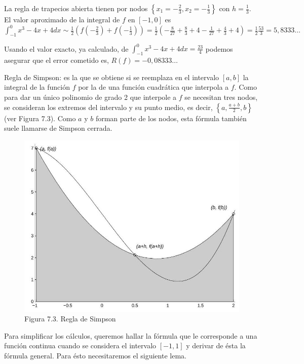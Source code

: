 \documentclass[10pt]{book}
\begin{document}
La regla de trapecios abierta tienen por nodos $\left\{x_{1}=-\frac{2}{3}, x_{2}=-\frac{1}{3}\right\}$ con $h=\frac{1}{3}$. El valor aproximado de la integral de $f$ en $[-1,0]$ es\\
$\int_{-1}^{0} x^{3}-4 x+4 d x \sim \frac{1}{2}\left(f\left(-\frac{2}{3}\right)+f\left(-\frac{1}{3}\right)\right)=\frac{1}{2}\left(-\frac{8}{27}+\frac{8}{3}+4-\frac{1}{27}+\frac{4}{3}+4\right)=\frac{1}{2} \frac{53}{3}=5,8333 \ldots$

Usando el valor exacto, ya calculado, de $\int_{-1}^{0} x^{3}-4 x+4 d x=\frac{23}{4}$ podemos asegurar que el error cometido es, $R(f)=-0,08333 \ldots$

Regla de Simpson: es la que se obtiene si se reemplaza en el intervalo $[a, b]$ la integral de la función $f$ por la de una función cuadrática que interpola a $f$. Como para dar un único polinomio de grado 2 que interpole a $f$ se necesitan tres nodos, se consideran los extremos del intervalo y su punto medio, es decir, $\left\{a, \frac{a+b}{2}, b\right\}$ (ver Figura 7.3). Como $a$ y $b$ forman parte de los nodos, esta fórmula también suele llamarse de Simpson cerrada.

\begin{figure}[h]
\begin{center}
  \includegraphics[width=\textwidth]{2025_09_05_3888c9ac96bd653d96b4g-141}
\captionsetup{labelformat=empty}
\caption{Figura 7.3. Regla de Simpson}
\end{center}
\end{figure}

Para simplificar los cálculos, queremos hallar la fórmula que le corresponde a una función continua cuando se considera el intervalo $[-1,1]$ y derivar de ésta la fórmula general. Para ésto necesitaremos el siguiente lema.
\end{document}
